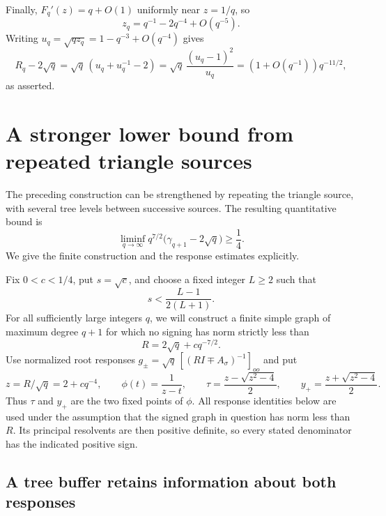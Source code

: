 \documentclass[11pt]{article}
\numberwithin{equation}{section}
\begin{document}
Finally, $F_q'(z)=q+O(1)$ uniformly near $z=1/q$, so
\[
 z_q=q^{-1}-2q^{-4}+O(q^{-5}).
\]
Writing $u_q=\sqrt{qz_q}=1-q^{-3}+O(q^{-4})$ gives
\[
 R_q-2\sqrt q
 =\sqrt q\,(u_q+u_q^{-1}-2)
 =\sqrt q\,\frac{(u_q-1)^2}{u_q}
 =(1+O(q^{-1}))q^{-11/2},
\]
as asserted.
\section{A stronger lower bound from repeated triangle sources}

The preceding construction can be strengthened by repeating the
triangle source, with several tree levels between successive sources.
The resulting quantitative bound is
\begin{equation}\label{eq:buffered-main}
 \liminf_{q\to\infty}q^{7/2}
 \bigl(\gamma_{q+1}-2\sqrt q\bigr)\ge\frac14.
\end{equation}
We give the finite construction and the response estimates explicitly.

Fix $0<c<1/4$, put $s=\sqrt c$, and choose a fixed integer $L\ge2$
such that
\begin{equation}\label{eq:buffer-choice}
 s<\frac{L-1}{2(L+1)}.
\end{equation}
For all sufficiently large integers $q$, we will construct a finite
simple graph of maximum degree $q+1$ for which no signing has norm
strictly less than
\[
 R=2\sqrt q+cq^{-7/2}.
\]
Use normalized root responses $g_\pm=\sqrt q\,
[(RI\mp A_\sigma)^{-1}]_{oo}$ and put
\[
 z=R/\sqrt q=2+cq^{-4},\qquad
 \phi(t)=\frac1{z-t},\qquad
 \tau=\frac{z-\sqrt{z^2-4}}2,\qquad
 y_+=\frac{z+\sqrt{z^2-4}}2.
\]
Thus $\tau$ and $y_+$ are the two fixed points of $\phi$.
All response identities below are used under the assumption that the
signed graph in question has norm less than $R$. Its principal
resolvents are then positive definite, so every stated denominator
has the indicated positive sign.

\subsection*{A tree buffer retains information about both responses}
\end{document}

